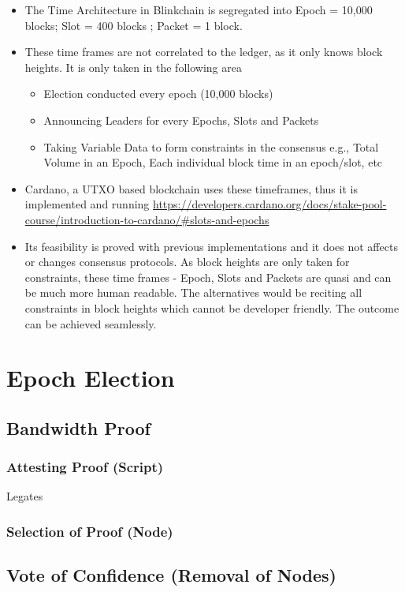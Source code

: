 \documentclass[a4paper,11pt]{article}
\begin{document}
\begin{itemize}
\item The Time Architecture in Blinkchain is segregated into Epoch = 10,000 blocks; Slot = 400 blocks ; Packet = 1 block.
\item These time frames are not correlated to the ledger, as it only knows block heights. It is only taken in the following area
\begin{itemize}
\item Election conducted every epoch (10,000 blocks)
\item Announcing Leaders for every Epochs, Slots and Packets
\item Taking Variable Data to form constraints in the consensus e.g., Total Volume in an Epoch, Each individual block time in an epoch/slot, etc
\end{itemize}
\item Cardano, a UTXO based blockchain uses these timeframes, thus it is implemented and running \url{https://developers.cardano.org/docs/stake-pool-course/introduction-to-cardano/#slots-and-epochs}
\item Its feasibility is proved with previous implementations and it does not affects or changes consensus protocols. As block heights are only taken for constraints, these time frames - Epoch, Slots and Packets are quasi and can be much more human readable. The alternatives would be reciting all constraints in block heights which cannot be developer friendly. The outcome can be achieved seamlessly.
\end{itemize}

\section{Epoch Election}
\subsection{Bandwidth Proof}
\subsubsection{Attesting Proof (Script)}
Legates
\subsubsection{Selection of Proof (Node)}
\subsection{Vote of Confidence (Removal of Nodes)}
\end{document}
